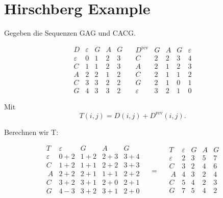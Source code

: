 
\section{Hirschberg Example}\label{sec:hirschberg-example}

Gegeben die Sequenzen GAG und CACG.

\[
    \begin{array}{c|cccc}
        D & \varepsilon & G & A & G\\\hline
        \varepsilon & 0&1&2&3\\
        C&1&1&2&3\\
        A&2&2&1&2\\
        C&3&3&2&2\\
        G&4&3&3&2
    \end{array}
    \quad
    \begin{array}{c|cccc}
        D^{\mathrm{rev}} & G&A&G&\varepsilon\\\hline
        C&2&2&3&4\\
        A&2&1&2&3\\
        C&2&1&1&2\\
        G&2&1&0&1\\
        \varepsilon&3&2&1&0
    \end{array}
\]

Mit
\[
    T(i,j) = D(i,j) + D^{\mathrm{rev}}(i,j).
\]

Berechnen wir T:

\[
    \begin{array}{c|cccc}
        T & \varepsilon&G&A&G\\\hline
        \varepsilon &0+2&1+2&2+3&3+4\\
        C&1+2&1+1&2+2&3+3\\\
        A&2+2&2+1&1+1&2+2\\
        C&3+2&3+1&2+0&2+1\\
        G&4-3&3+2&3+1&2+0\\
    \end{array}
    \quad = \quad
    \begin{array}{c|cccc}
        T & \varepsilon&G&A&G\\\hline
        \varepsilon &2&3&5&7\\
        C&3&2&4&6\\\
        A&4&3&2&4\\
        C&5&4&2&3\\
        G&7&5&4&2\\
    \end{array}
\]

